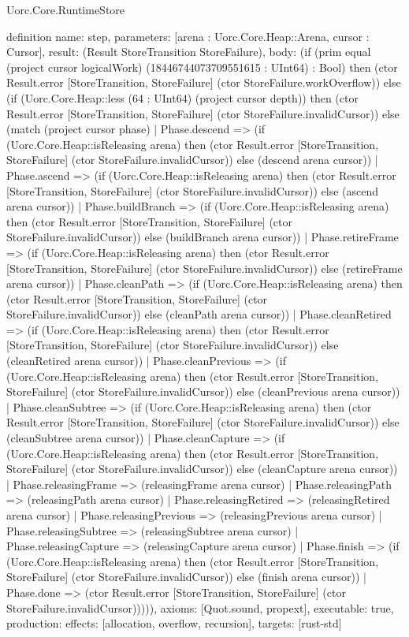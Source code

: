 \begin{lexlean}{Uorc.Core.RuntimeStore}
\begin{semanticmodule}
definition{
  name: step,
  parameters: [arena : Uorc.Core.Heap::Arena, cursor : Cursor],
  result: (Result StoreTransition StoreFailure),
  body: (if (prim equal (project cursor logicalWork) (18446744073709551615 : UInt64) : Bool) then (ctor Result.error [StoreTransition, StoreFailure] (ctor StoreFailure.workOverflow)) else (if (Uorc.Core.Heap::less (64 : UInt64) (project cursor depth)) then (ctor Result.error [StoreTransition, StoreFailure] (ctor StoreFailure.invalidCursor)) else (match (project cursor phase)
    | Phase.descend => (if (Uorc.Core.Heap::isReleasing arena) then (ctor Result.error [StoreTransition, StoreFailure] (ctor StoreFailure.invalidCursor)) else (descend arena cursor))
    | Phase.ascend => (if (Uorc.Core.Heap::isReleasing arena) then (ctor Result.error [StoreTransition, StoreFailure] (ctor StoreFailure.invalidCursor)) else (ascend arena cursor))
    | Phase.buildBranch => (if (Uorc.Core.Heap::isReleasing arena) then (ctor Result.error [StoreTransition, StoreFailure] (ctor StoreFailure.invalidCursor)) else (buildBranch arena cursor))
    | Phase.retireFrame => (if (Uorc.Core.Heap::isReleasing arena) then (ctor Result.error [StoreTransition, StoreFailure] (ctor StoreFailure.invalidCursor)) else (retireFrame arena cursor))
    | Phase.cleanPath => (if (Uorc.Core.Heap::isReleasing arena) then (ctor Result.error [StoreTransition, StoreFailure] (ctor StoreFailure.invalidCursor)) else (cleanPath arena cursor))
    | Phase.cleanRetired => (if (Uorc.Core.Heap::isReleasing arena) then (ctor Result.error [StoreTransition, StoreFailure] (ctor StoreFailure.invalidCursor)) else (cleanRetired arena cursor))
    | Phase.cleanPrevious => (if (Uorc.Core.Heap::isReleasing arena) then (ctor Result.error [StoreTransition, StoreFailure] (ctor StoreFailure.invalidCursor)) else (cleanPrevious arena cursor))
    | Phase.cleanSubtree => (if (Uorc.Core.Heap::isReleasing arena) then (ctor Result.error [StoreTransition, StoreFailure] (ctor StoreFailure.invalidCursor)) else (cleanSubtree arena cursor))
    | Phase.cleanCapture => (if (Uorc.Core.Heap::isReleasing arena) then (ctor Result.error [StoreTransition, StoreFailure] (ctor StoreFailure.invalidCursor)) else (cleanCapture arena cursor))
    | Phase.releasingFrame => (releasingFrame arena cursor)
    | Phase.releasingPath => (releasingPath arena cursor)
    | Phase.releasingRetired => (releasingRetired arena cursor)
    | Phase.releasingPrevious => (releasingPrevious arena cursor)
    | Phase.releasingSubtree => (releasingSubtree arena cursor)
    | Phase.releasingCapture => (releasingCapture arena cursor)
    | Phase.finish => (if (Uorc.Core.Heap::isReleasing arena) then (ctor Result.error [StoreTransition, StoreFailure] (ctor StoreFailure.invalidCursor)) else (finish arena cursor))
    | Phase.done => (ctor Result.error [StoreTransition, StoreFailure] (ctor StoreFailure.invalidCursor))))),
  axioms: [Quot.sound, propext],
  executable: true,
  production: {effects: [allocation, overflow, recursion], targets: [rust-std]}
}


\end{semanticmodule}
\end{lexlean}
